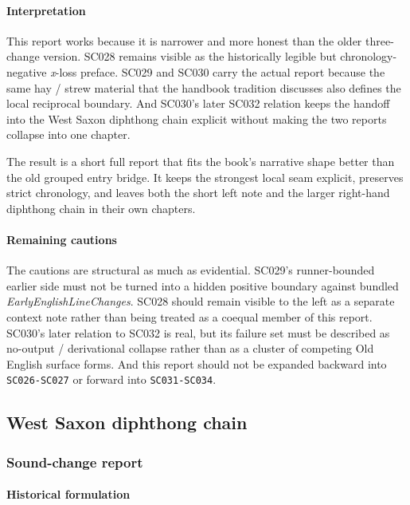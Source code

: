 \documentclass[
  british,
  a4paper,
]{article}
\begin{document}
\paragraph{Interpretation}\label{interpretation-21}

This report works because it is narrower and more honest than the older
three-change version. SC028 remains visible as the historically legible
but chronology-negative \emph{x}-loss preface. SC029 and SC030 carry the
actual report because the same hay / strew material that the handbook
tradition discusses also defines the local reciprocal boundary. And
SC030's later SC032 relation keeps the handoff into the West Saxon
diphthong chain explicit without making the two reports collapse into
one chapter.

The result is a short full report that fits the book's narrative shape
better than the old grouped entry bridge. It keeps the strongest local
seam explicit, preserves strict chronology, and leaves both the short
left note and the larger right-hand diphthong chain in their own
chapters.

\paragraph{Remaining cautions}\label{remaining-cautions-21}

The cautions are structural as much as evidential. SC029's
runner-bounded earlier side must not be turned into a hidden positive
boundary against bundled \emph{EarlyEnglishLineChanges}. SC028 should
remain visible to the left as a separate context note rather than being
treated as a coequal member of this report. SC030's later relation to
SC032 is real, but its failure set must be described as no-output /
derivational collapse rather than as a cluster of competing Old English
surface forms. And this report should not be expanded backward into
\texttt{SC026-SC027} or forward into \texttt{SC031-SC034}.

\subsection{West Saxon diphthong
chain}\label{west-saxon-diphthong-chain}

\subsubsection{Sound-change report}\label{sound-change-report-22}

\paragraph{Historical formulation}\label{historical-formulation-22}
\end{document}
